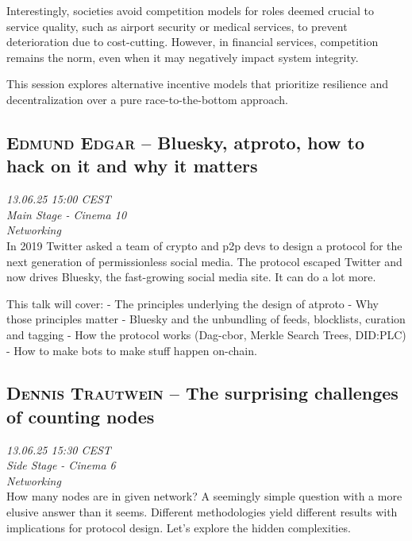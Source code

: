 Interestingly, societies avoid competition models for roles deemed crucial to service quality, such as airport security or medical services, to prevent deterioration due to cost-cutting. However, in financial services, competition remains the norm, even when it may negatively impact system integrity.

This session explores alternative incentive models that prioritize resilience and decentralization over a pure race-to-the-bottom approach.

\clearpage
\subsection {\textsc{Edmund Edgar}  -- Bluesky, atproto, how to hack on it and why it matters} \noindent \textit {13.06.25 15:00 CEST\\ Main Stage - Cinema 10\\ Networking}\\[1em] In 2019 Twitter asked a team of crypto and p2p devs to design a protocol for the next generation of permissionless social media. The protocol escaped Twitter and now drives Bluesky, the fast-growing social media site. It can do a lot more.

This talk will cover:
 - The principles underlying the design of atproto
 - Why those principles matter
 - Bluesky and the unbundling of feeds, blocklists, curation and tagging
 - How the protocol works (Dag-cbor, Merkle Search Trees, DID:PLC)
 - How to make bots to make stuff happen on-chain.

\clearpage
\subsection {\textsc{Dennis Trautwein}  -- The surprising challenges of counting nodes} \noindent \textit {13.06.25 15:30 CEST\\ Side Stage - Cinema 6\\ Networking}\\[1em] How many nodes are in given network? A seemingly simple question with a more elusive answer than it seems. Different methodologies yield different results with implications for protocol design. Let's explore the hidden complexities.

\clearpage
